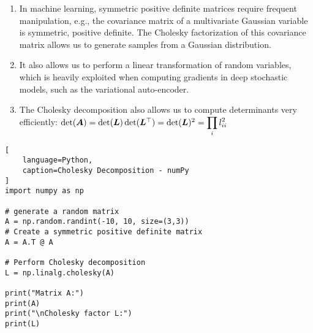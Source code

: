 \begin{enumerate}
    \item In machine learning, symmetric positive definite matrices require frequent manipulation, e.g., the covariance matrix of a multivariate Gaussian variable is symmetric, positive definite. 
    The Cholesky factorization of this covariance matrix allows us to generate samples from a Gaussian distribution.
    \hfill \cite{mfml/book/mml/Deisenroth-Faisal-Ong}

    \item  It also allows us to perform a linear transformation of random variables, which is heavily exploited when computing gradients in deep stochastic models, such as the variational auto-encoder.
    \hfill \cite{mfml/book/mml/Deisenroth-Faisal-Ong}

    \item The Cholesky decomposition also allows us to compute determinants very efficiently: 
    $
        \det(\bm{A}) 
        = \det(\bm{L}) \det(\bm{L}^\top) 
        = \det(\bm{L})^2
        = \displaystyle\prod_i l_{ii}^2
    $
    \hfill \cite{mfml/book/mml/Deisenroth-Faisal-Ong}
\end{enumerate}


\begin{lstlisting}[
    language=Python,
    caption=Cholesky Decomposition - numPy
]
import numpy as np

# generate a random matrix
A = np.random.randint(-10, 10, size=(3,3))
# Create a symmetric positive definite matrix
A = A.T @ A

# Perform Cholesky decomposition
L = np.linalg.cholesky(A)

print("Matrix A:")
print(A)
print("\nCholesky factor L:")
print(L)
\end{lstlisting}







